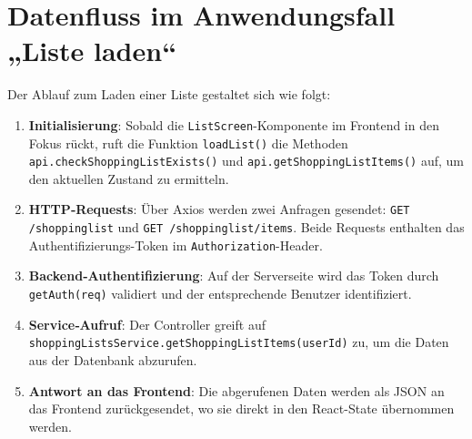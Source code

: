 \section{Datenfluss im Anwendungsfall „Liste laden“}
Der Ablauf zum Laden einer Liste gestaltet sich wie folgt:
\begin{enumerate}
  \item \textbf{Initialisierung}: Sobald die \texttt{ListScreen}-Komponente im Frontend in den Fokus rückt, ruft die Funktion \texttt{loadList()} die Methoden \texttt{api.checkShoppingListExists()} und \texttt{api.getShoppingListItems()} auf, um den aktuellen Zustand zu ermitteln.
  \item \textbf{HTTP‑Requests}: Über Axios werden zwei Anfragen gesendet: \texttt{GET /shoppinglist} und \texttt{GET /shoppinglist/items}. Beide Requests enthalten das Authentifizierungs-Token im \texttt{Authorization}-Header.
  \item \textbf{Backend‑Authentifizierung}: Auf der Serverseite wird das Token durch \texttt{getAuth(req)} validiert und der entsprechende Benutzer identifiziert.
  \item \textbf{Service‑Aufruf}: Der Controller greift auf \texttt{shoppingListsService.getShoppingListItems(userId)} zu, um die Daten aus der Datenbank abzurufen.
  \item \textbf{Antwort an das Frontend}: Die abgerufenen Daten werden als JSON an das Frontend zurückgesendet, wo sie direkt in den React-State übernommen werden.
\end{enumerate}
